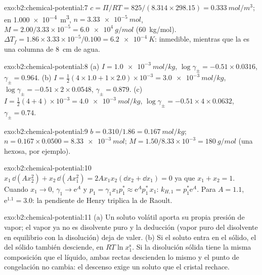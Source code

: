 \begin{solution}{exo:b2:chemical-potential:7}
$c = \Pi/RT = 825/(8.314 \times 298.15) = \qty{0.333}{mol/m^3}$; en
\qty{1.000e-4}{m^3}, $n = \qty{3.33e-5}{mol}$, $M = 2.00/3.33 \times 10^{-5}
= \qty{6.0e4}{g/mol}$ (\qty{60}{kg/mol}). $\Delta T_f = 1.86 \times 3.33
\times 10^{-5}/0.100 = \qty{6.2e-4}{K}$: inmedible, mientras que la  es una columna de \qty{8}{cm} de agua.
\end{solution}

\begin{solution}{exo:b2:chemical-potential:8}
(a) $I = \qty{1.0e-3}{mol/kg}$, $\log\gamma_\pm = -0.51 \times 0.0316$,
$\gamma_\pm = 0.964$. (b) $I = \frac12(4 \times 1.0 + 1 \times 2.0) \times
10^{-3} = \qty{3.0e-3}{mol/kg}$, $\log\gamma_\pm = -0.51 \times 2 \times 0.0548$,
$\gamma_\pm = 0.879$. (c) $I = \frac12(4 + 4) \times 10^{-3} = \qty{4.0e-3}{mol/kg}$,
$\log\gamma_\pm = -0.51 \times 4 \times 0.0632$, $\gamma_\pm = 0.74$.
\end{solution}

\begin{solution}{exo:b2:chemical-potential:9}
$b = 0.310/1.86 = \qty{0.167}{mol/kg}$; $n = 0.167 \times 0.0500 =
\qty{8.33e-3}{mol}$; $M = 1.50/8.33 \times 10^{-3} = \qty{180}{g/mol}$ (una
hexosa, por ejemplo).
\end{solution}

\begin{solution}{exo:b2:chemical-potential:10}
$x_1\,\dd(Ax_2^2) + x_2\,\dd(Ax_1^2) = 2Ax_1x_2(\dd x_2 + \dd x_1) = 0$ ya que
$x_1 + x_2 = 1$. Cuando $x_1 \to 0$, $\gamma_1 \to \mathrm e^{A}$ y $p_1 =
\gamma_1x_1p_1^* \approx \mathrm e^{A}p_1^*\,x_1$: $k_{H,1} = p_1^*\mathrm e^A$.
Para $A = 1.1$, $\mathrm e^{1.1} = 3.0$: la pendiente de Henry triplica la de Raoult.
\end{solution}

\begin{solution}{exo:b2:chemical-potential:11}
(a) Un soluto volátil aporta su propia presión de vapor; el vapor ya no es
disolvente puro y la deducción (vapor puro del disolvente en
equilibrio con la disolución) deja de valer. (b) Si el soluto entra en el sólido, el
 del sólido también desciende, en $RT\ln x_1^{\text{s}}$. Si la
disolución sólida tiene la misma composición que el líquido, ambas rectas descienden
lo mismo y el punto de congelación no cambia: el descenso
exige un soluto que el cristal rechace.
\end{solution}

